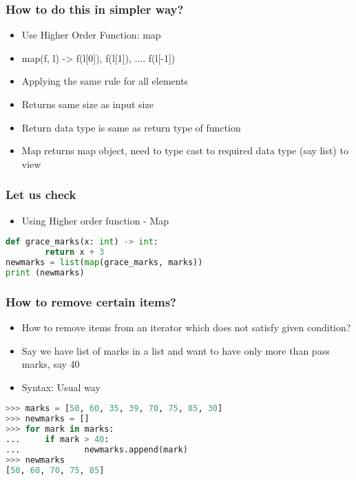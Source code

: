 \documentclass[14pt]{beamer}
\begin{document}
    \begin{frame}[containsverbatim]
        \frametitle{How to do this in simpler way?}
        \begin{itemize}
            \item \alert{Use Higher Order Function: map}
            \item map(f, l) -> f(l[0]), f(l[1]), .... f(l[-1])
            \item Applying the same rule for all elements 
            \item Returns same size as input size
            \item Return data type is same as return type of function 
            \item Map returns map object, need to type cast to required data type (say list) to view
        \end{itemize}
    \end{frame}

    \begin{frame}[containsverbatim]
        \frametitle{Let us check}
		\begin{itemize}
		\item Using Higher order function - Map
		\end{itemize}
        \begin{lstlisting}[language=Python]
def grace_marks(x: int) -> int:
        return x + 3
newmarks = list(map(grace_marks, marks))
print (newmarks)
        \end{lstlisting}
    \end{frame}

    \begin{frame}[containsverbatim]
        \frametitle{How to remove certain items?}
        \begin{itemize}
            \item How to remove items from an iterator which does not satisfy given condition?
            \item Say we have list of marks in a list and want to have only more than pass marks, say 40
            \item \alert{Syntax: Usual way}
        \end{itemize}
        \begin{lstlisting}[language=Python]
>>> marks = [50, 60, 35, 39, 70, 75, 85, 30]
>>> newmarks = []
>>> for mark in marks:
...     if mark > 40:
...             newmarks.append(mark)
>>> newmarks
[50, 60, 70, 75, 85]
        \end{lstlisting}
    \end{frame}
\end{document}
